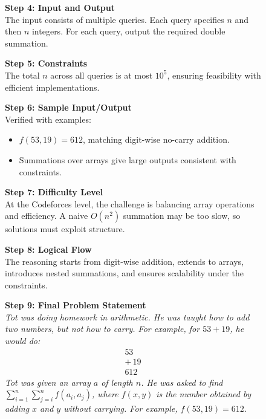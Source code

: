 \begin{figure}[htb]
{\begin{minipage}{0.99\textwidth}
            \vspace{0.5em}
            \noindent\textbf{Step 4: Input and Output} \\
            The input consists of multiple queries. Each query specifies $n$ and then $n$ integers. For each query, output the required double summation.

            \vspace{0.5em}
            \noindent\textbf{Step 5: Constraints} \\
            The total $n$ across all queries is at most $10^5$, ensuring feasibility with efficient implementations.

            \vspace{0.5em}
            \noindent\textbf{Step 6: Sample Input/Output} \\
            Verified with examples:
            \begin{itemize}
                \item $f(53,19)=612$, matching digit-wise no-carry addition.
                \item Summations over arrays give large outputs consistent with constraints.
            \end{itemize}

            \vspace{0.5em}
            \noindent\textbf{Step 7: Difficulty Level} \\
            At the Codeforces level, the challenge is balancing array operations and efficiency. A naive $O(n^2)$ summation may be too slow, so solutions must exploit structure.

            \vspace{0.5em}
            \noindent\textbf{Step 8: Logical Flow} \\
            The reasoning starts from digit-wise addition, extends to arrays, introduces nested summations, and ensures scalability under the constraints.

            \vspace{0.5em}
            \noindent\textbf{Step 9: Final Problem Statement} \\
            \textit{Tot was doing homework in arithmetic. He was taught how to add two numbers, but not how to carry. For example, for $53+19$, he would do:}
            \[
            \begin{array}{r}
            53 \\
            +\,19 \\
            \hline
            612
            \end{array}
            \]
            \textit{Tot was given an array $a$ of length $n$. He was asked to find $\sum_{i=1}^{n}\sum_{j=i}^{n} f(a_i,a_j)$, where $f(x,y)$ is the number obtained by adding $x$ and $y$ without carrying. For example, $f(53,19)=612$.}


\end{minipage}}
\end{figure}
